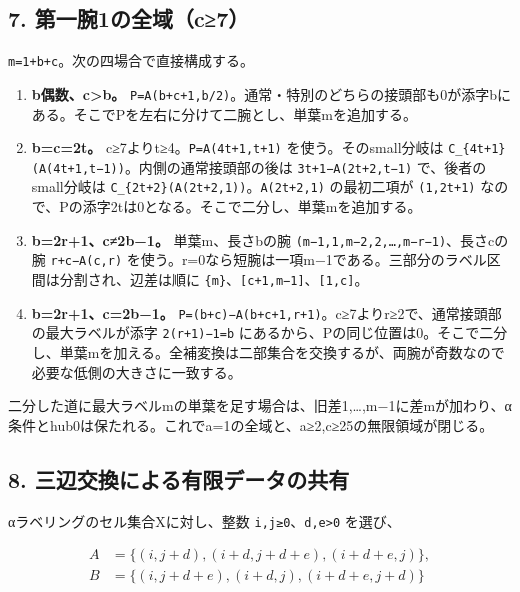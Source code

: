 \documentclass[
  10pt,
  a4paper,
]{article}
\providecommand{\tightlist}{%
  \setlength{\itemsep}{0pt}\setlength{\parskip}{0pt}}
\let\originaltexttt\texttt
\renewcommand{\texttt}[1]{\leavevmode\allowbreak\mbox{\originaltexttt{#1}}}
\begin{document}
\subsection{7.
第一腕1の全域（c≥7）}\label{ux7b2cux4e00ux81551ux306eux5168ux57dfc7}

\texttt{m=1+b+c}。次の四場合で直接構成する。

\begin{enumerate}
\def\labelenumi{\arabic{enumi}.}
\tightlist
\item
  \textbf{b偶数、c\textgreater b。}
  \texttt{P=A(b+c+1,b/2)}。通常・特別のどちらの接頭部も0が添字bにある。そこでPを左右に分けて二腕とし、単葉mを追加する。
\item
  \textbf{b=c=2t。} c≥7よりt≥4。\texttt{P=A(4t+1,t+1)}
  を使う。そのsmall分岐は
  \texttt{C\_\{4t+1\}(A(4t+1,t−1))}。内側の通常接頭部の後は
  \texttt{3t+1−A(2t+2,t−1)} で、後者のsmall分岐は
  \texttt{C\_\{2t+2\}(A(2t+2,1))}。\texttt{A(2t+2,1)} の最初二項が
  \texttt{(1,2t+1)}
  なので、Pの添字2tは0となる。そこで二分し、単葉mを追加する。
\item
  \textbf{b=2r+1、c≠2b−1。} 単葉m、長さbの腕
  \texttt{(m−1,1,m−2,2,…,m−r−1)}、長さcの腕 \texttt{r+c−A(c,r)}
  を使う。r=0なら短腕は一項m−1である。三部分のラベル区間は分割され、辺差は順に
  \texttt{\{m\}}、\texttt{{[}c+1,m−1{]}}、\texttt{{[}1,c{]}}。
\item
  \textbf{b=2r+1、c=2b−1。}
  \texttt{P=(b+c)−A(b+c+1,r+1)}。c≥7よりr≥2で、通常接頭部の最大ラベルが添字
  \texttt{2(r+1)−1=b}
  にあるから、Pの同じ位置は0。そこで二分し、単葉mを加える。全補変換は二部集合を交換するが、両腕が奇数なので必要な低側の大きさに一致する。
\end{enumerate}

二分した道に最大ラベルmの単葉を足す場合は、旧差1,\ldots,m−1に差mが加わり、α条件とhub0は保たれる。これでa=1の全域と、a≥2,c≥25の無限領域が閉じる。

\subsection{8.
三辺交換による有限データの共有}\label{ux4e09ux8fbaux4ea4ux63dbux306bux3088ux308bux6709ux9650ux30c7ux30fcux30bfux306eux5171ux6709}

αラベリングのセル集合Xに対し、整数
\texttt{i,j≥0}、\texttt{d,e\textgreater{}0} を選び、

\[
\begin{aligned}
A&=\{(i,j+d),(i+d,j+d+e),(i+d+e,j)\},\\
B&=\{(i,j+d+e),(i+d,j),(i+d+e,j+d)\}
\end{aligned}
\]
\end{document}
